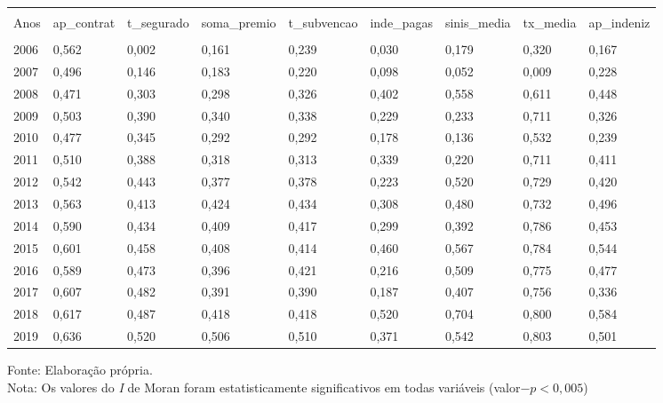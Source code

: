 \footnotesize
\vspace{0.05cm}
\begin{tabularx}{\textwidth}{lXXXXXXXX}
    \hline \\[-1.9ex]	 
    Anos & ap\_contrat & t\_segurado & soma\_premio & t\_subvencao & inde\_pagas & sinis\_media & tx\_media & ap\_indeniz    \\
    \hline \\[-1.9ex]	 
    2006 & 0,562 & 0,002 & 0,161 &0,239 & 0,030 & 0,179 & 0,320 & 0,167 \\
    2007 & 0,496 & 0,146 & 0,183 &0,220 & 0,098 & 0,052 & 0,009 & 0,228 \\
    2008 & 0,471 & 0,303 & 0,298 &0,326 & 0,402 & 0,558 & 0,611 & 0,448 \\
    2009 & 0,503 & 0,390 & 0,340 &0,338 & 0,229 & 0,233 & 0,711 & 0,326 \\
    2010 & 0,477 & 0,345 & 0,292 &0,292 & 0,178 & 0,136 & 0,532 & 0,239 \\
    2011 & 0,510 & 0,388 & 0,318 &0,313 & 0,339 & 0,220 & 0,711 & 0,411 \\
    2012 & 0,542 & 0,443 & 0,377 &0,378 & 0,223 & 0,520 & 0,729 & 0,420 \\
    2013 & 0,563 & 0,413 & 0,424 &0,434 & 0,308 & 0,480 & 0,732 & 0,496 \\
    2014 & 0,590 & 0,434 & 0,409 &0,417 & 0,299 & 0,392 & 0,786 & 0,453 \\
    2015 & 0,601 & 0,458 & 0,408 &0,414 & 0,460 & 0,567 & 0,784 & 0,544 \\
    2016 & 0,589 & 0,473 & 0,396 &0,421 & 0,216 & 0,509 & 0,775 & 0,477 \\
    2017 & 0,607 & 0,482 & 0,391 &0,390 & 0,187 & 0,407 & 0,756 & 0,336 \\
    2018 & 0,617 & 0,487 & 0,418 &0,418 & 0,520 & 0,704 & 0,800 & 0,584 \\
    2019 & 0,636 & 0,520 & 0,506 &0,510 & 0,371 & 0,542 & 0,803 & 0,501 \\
	\hline 
\end{tabularx}
\footnotesize{Fonte: Elaboração própria.  }\\
\footnotesize{Nota: Os valores do \textit{I} de Moran foram estatisticamente significativos em todas variáveis (valor$-p<0,005$)}\\